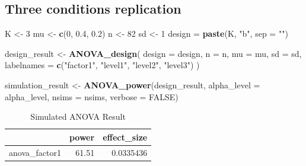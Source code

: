 \documentclass[
]{book}
\newenvironment{Shaded}{\begin{snugshade}}{\end{snugshade}}
\newcommand{\DataTypeTok}[1]{\textcolor[rgb]{0.13,0.29,0.53}{#1}}
\newcommand{\DecValTok}[1]{\textcolor[rgb]{0.00,0.00,0.81}{#1}}
\newcommand{\FloatTok}[1]{\textcolor[rgb]{0.00,0.00,0.81}{#1}}
\newcommand{\KeywordTok}[1]{\textcolor[rgb]{0.13,0.29,0.53}{\textbf{#1}}}
\newcommand{\NormalTok}[1]{#1}
\newcommand{\OtherTok}[1]{\textcolor[rgb]{0.56,0.35,0.01}{#1}}
\newcommand{\StringTok}[1]{\textcolor[rgb]{0.31,0.60,0.02}{#1}}
\begin{document}
\hypertarget{three-conditions-replication-2}{%
\subsection{Three conditions replication}\label{three-conditions-replication-2}}

\begin{Shaded}
\begin{Highlighting}[]
\NormalTok{K <-}\StringTok{ }\DecValTok{3}
\NormalTok{mu <-}\StringTok{ }\KeywordTok{c}\NormalTok{(}\DecValTok{0}\NormalTok{, }\FloatTok{0.4}\NormalTok{, }\FloatTok{0.2}\NormalTok{)}
\NormalTok{n <-}\StringTok{ }\DecValTok{82}
\NormalTok{sd <-}\StringTok{ }\DecValTok{1}
\NormalTok{design =}\StringTok{ }\KeywordTok{paste}\NormalTok{(K, }\StringTok{"b"}\NormalTok{, }\DataTypeTok{sep =} \StringTok{""}\NormalTok{)}
\end{Highlighting}
\end{Shaded}

\begin{Shaded}
\begin{Highlighting}[]
\NormalTok{design_result <-}\StringTok{ }\KeywordTok{ANOVA_design}\NormalTok{(}
  \DataTypeTok{design =}\NormalTok{ design,}
  \DataTypeTok{n =}\NormalTok{ n,}
  \DataTypeTok{mu =}\NormalTok{ mu,}
  \DataTypeTok{sd =}\NormalTok{ sd,}
  \DataTypeTok{labelnames =} \KeywordTok{c}\NormalTok{(}\StringTok{"factor1"}\NormalTok{, }\StringTok{"level1"}\NormalTok{, }\StringTok{"level2"}\NormalTok{, }\StringTok{"level3"}\NormalTok{)}
\NormalTok{  )}
\end{Highlighting}
\end{Shaded}

\begin{Shaded}
\begin{Highlighting}[]
\NormalTok{simulation_result <-}\StringTok{ }\KeywordTok{ANOVA_power}\NormalTok{(design_result, }
                                 \DataTypeTok{alpha_level =}\NormalTok{ alpha_level, }
                                 \DataTypeTok{nsims =}\NormalTok{ nsims,}
                                 \DataTypeTok{verbose =} \OtherTok{FALSE}\NormalTok{)}
\end{Highlighting}
\end{Shaded}

\begin{table}[!h]

\caption{\label{tab:unnamed-chunk-334}Simulated ANOVA Result}
\centering
\begin{tabular}[t]{l|r|r}
\hline
  & power & effect\_size\\
\hline
anova\_factor1 & 61.51 & 0.0335436\\
\hline
\end{tabular}
\end{table}
\end{document}
